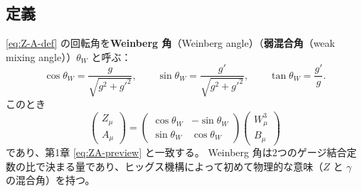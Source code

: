 \documentclass[uplatex,dvipdfmx,a4paper,11pt,openany]{jsbook}
\newcommand{\term}[2]{\textbf{#1}（#2）}
\numberwithin{equation}{chapter}
\theoremstyle{definition}
\theoremstyle{plain}
\theoremstyle{remark}
\begin{document}
\subsection{定義}
\eqref{eq:Z-A-def} の回転角を\term{Weinberg 角}{Weinberg angle}（\term{弱混合角}{weak mixing angle}）$\theta_W$ と呼ぶ：
\begin{equation}
\cos\theta_W=\frac{g}{\sqrt{g^2+g'^2}},\qquad
\sin\theta_W=\frac{g'}{\sqrt{g^2+g'^2}},\qquad
\tan\theta_W=\frac{g'}{g}.
\label{eq:weinberg-angle}
\end{equation}
このとき
\begin{equation}
\begin{pmatrix}Z_\mu\\ A_\mu\end{pmatrix}
=\begin{pmatrix}\cos\theta_W&-\sin\theta_W\\ \sin\theta_W&\cos\theta_W\end{pmatrix}
\begin{pmatrix}W^3_\mu\\ B_\mu\end{pmatrix}
\end{equation}
であり、第1章 \eqref{eq:ZA-preview} と一致する。
Weinberg 角は2つのゲージ結合定数の比で決まる量であり、ヒッグス機構によって初めて物理的な意味（$Z$ と $\gamma$ の混合角）を持つ。
\end{document}
